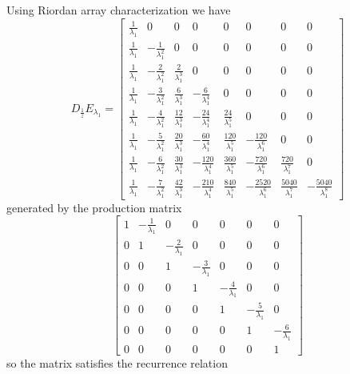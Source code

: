 Using Riordan array characterization we have 
\begin{displaymath}
D_{\frac{1}{z}}E_{\lambda_{1}} = \left[\begin{matrix}\frac{1}{\lambda_{1}} & 0 & 0 & 0 & 0 & 0 & 0 & 0\\\frac{1}{\lambda_{1}} & - \frac{1}{\lambda_{1}^{2}} & 0 & 0 & 0 & 0 & 0 & 0\\\frac{1}{\lambda_{1}} & - \frac{2}{\lambda_{1}^{2}} & \frac{2}{\lambda_{1}^{3}} & 0 & 0 & 0 & 0 & 0\\\frac{1}{\lambda_{1}} & - \frac{3}{\lambda_{1}^{2}} & \frac{6}{\lambda_{1}^{3}} & - \frac{6}{\lambda_{1}^{4}} & 0 & 0 & 0 & 0\\\frac{1}{\lambda_{1}} & - \frac{4}{\lambda_{1}^{2}} & \frac{12}{\lambda_{1}^{3}} & - \frac{24}{\lambda_{1}^{4}} & \frac{24}{\lambda_{1}^{5}} & 0 & 0 & 0\\\frac{1}{\lambda_{1}} & - \frac{5}{\lambda_{1}^{2}} & \frac{20}{\lambda_{1}^{3}} & - \frac{60}{\lambda_{1}^{4}} & \frac{120}{\lambda_{1}^{5}} & - \frac{120}{\lambda_{1}^{6}} & 0 & 0\\\frac{1}{\lambda_{1}} & - \frac{6}{\lambda_{1}^{2}} & \frac{30}{\lambda_{1}^{3}} & - \frac{120}{\lambda_{1}^{4}} & \frac{360}{\lambda_{1}^{5}} & - \frac{720}{\lambda_{1}^{6}} & \frac{720}{\lambda_{1}^{7}} & 0\\\frac{1}{\lambda_{1}} & - \frac{7}{\lambda_{1}^{2}} & \frac{42}{\lambda_{1}^{3}} & - \frac{210}{\lambda_{1}^{4}} & \frac{840}{\lambda_{1}^{5}} & - \frac{2520}{\lambda_{1}^{6}} & \frac{5040}{\lambda_{1}^{7}} & - \frac{5040}{\lambda_{1}^{8}}\end{matrix}\right]
\end{displaymath}
generated by the production matrix
\begin{displaymath}
\left[\begin{matrix}1 & - \frac{1}{\lambda_{1}} & 0 & 0 & 0 & 0 & 0\\0 & 1 & - \frac{2}{\lambda_{1}} & 0 & 0 & 0 & 0\\0 & 0 & 1 & - \frac{3}{\lambda_{1}} & 0 & 0 & 0\\0 & 0 & 0 & 1 & - \frac{4}{\lambda_{1}} & 0 & 0\\0 & 0 & 0 & 0 & 1 & - \frac{5}{\lambda_{1}} & 0\\0 & 0 & 0 & 0 & 0 & 1 & - \frac{6}{\lambda_{1}}\\0 & 0 & 0 & 0 & 0 & 0 & 1\end{matrix}\right]
\end{displaymath}
so the matrix satisfies the recurrence relation 
